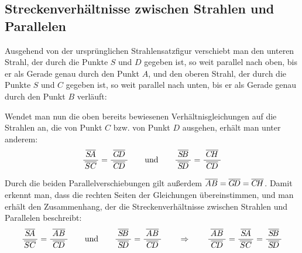 \documentclass
[
  draft    = true,
  fontsize = 11pt,
  parskip  = half-,
  BCOR     = 0pt,
  DIV      = 11
]
{scrartcl}
\begin{document}
\subsection*{Streckenverhältnisse zwischen Strahlen und Parallelen}
Ausgehend von der ursprünglichen Strahlensatzfigur verschiebt man den unteren
Strahl, der durch die Punkte $S$ und $D$ gegeben ist, so weit parallel nach
oben, bis er als Gerade genau durch den Punkt $A$, und den oberen
Strahl, der durch die Punkte $S$ und $C$ gegeben ist, so weit parallel nach
unten, bis er als Gerade genau durch den Punkt $B$ verläuft:
\begin{center}
\end{center}
Wendet man nun die oben bereits bewiesenen Verhältnisgleichungen auf die
Strahlen an, die von Punkt $C$ bzw. von Punkt $D$ ausgehen, erhält man
unter anderem:
\begin{equation*}
  \frac{\;\overline{S\!A}\;}{\overline{SC}}=\frac{\;\overline{G\!D}\;}{\overline{C\!D}}
  \qquad
  \text{und}
  \qquad
  \frac{\;\overline{S\!B}\;}{\overline{S\!D}}=\frac{\;\overline{C\!H}\;}{\overline{C\!D}}
\end{equation*}

Durch die beiden Parallelverschiebungen gilt außerdem $\overline{AB}=\overline{G\!D}=\overline{C\!H}$.
Damit erkennt man, dass die rechten Seiten der Gleichungen übereinstimmen, und
man erhält den Zusammenhang, der die Streckenverhältnisse zwischen Strahlen und
Parallelen beschreibt:
\begin{equation*}
  \frac{\;\lineSA\;}{\lineSC}=\frac{\;\lineAB\;}{\lineCD}
  \qquad
  \text{und}
  \qquad
  \frac{\;\lineSB\;}{\lineSD}=\frac{\;\lineAB\;}{\lineCD}
  \qquad
  \Rightarrow
  \qquad
  \frac{\;\lineAB\;}{\lineCD}=\frac{\;\lineSA\;}{\lineSC}=\frac{\;\lineSB\;}{\lineSD}
\end{equation*}

\end{document}
